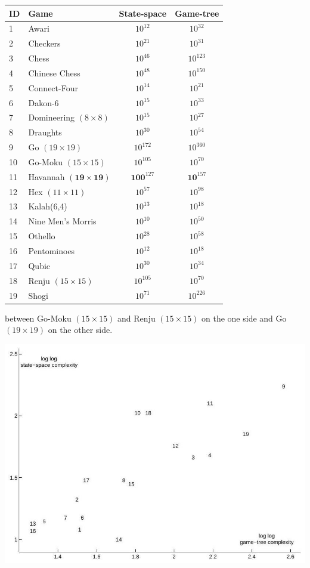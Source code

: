 \documentclass[10pt]{article}
\begin{document}
\begin{center}
\begin{tabular}{llcc}
\hline
ID & Game & State-space & Game-tree \\
\hline
1 & Awari & $10^{12}$ & $10^{32}$ \\
2 & Checkers & $10^{21}$ & $10^{31}$ \\
3 & Chess & $10^{46}$ & $10^{123}$ \\
4 & Chinese Chess & $10^{48}$ & $10^{150}$ \\
5 & Connect-Four & $10^{14}$ & $10^{21}$ \\
6 & Dakon-6 & $10^{15}$ & $10^{33}$ \\
7 & Domineering $(8 \times 8)$ & $10^{15}$ & $10^{27}$ \\
8 & Draughts & $10^{30}$ & $10^{54}$ \\
9 & Go $(19 \times 19)$ & $10^{172}$ & $10^{360}$ \\
10 & Go-Moku $(15 \times 15)$ & $10^{105}$ & $10^{70}$ \\
11 & Havannah $(\mathbf{1 9 \times 1 9})$ & $\mathbf{1 0} \mathbf{0}^{127}$ & $\mathbf{1 0}^{157}$ \\
12 & Hex $(11 \times 11)$ & $10^{57}$ & $10^{98}$ \\
13 & Kalah(6,4) & $10^{13}$ & $10^{18}$ \\
14 & Nine Men's Morris & $10^{10}$ & $10^{50}$ \\
15 & Othello & $10^{28}$ & $10^{58}$ \\
16 & Pentominoes & $10^{12}$ & $10^{18}$ \\
17 & Qubic & $10^{30}$ & $10^{34}$ \\
18 & Renju $(15 \times 15)$ & $10^{105}$ & $10^{70}$ \\
19 & Shogi & $10^{71}$ & $10^{226}$ \\
\hline
\end{tabular}
\end{center}

between Go-Moku $(15 \times 15)$ and Renju $(15 \times 15)$ on the one side and Go $(19 \times 19)$ on the other side.

\begin{center}
\includegraphics[max width=\textwidth]{2024_09_21_575efd6e0a8f951a52dfg-3}
\end{center}
\end{document}

